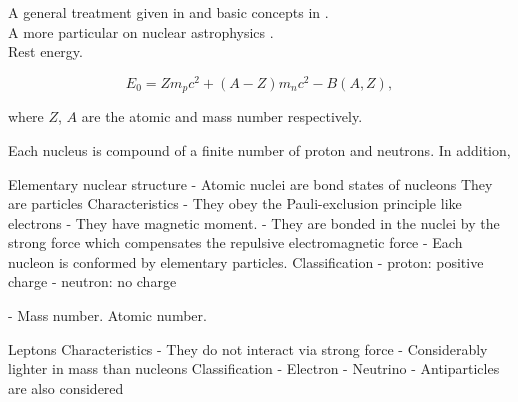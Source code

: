 \documentclass[openany]{book}
\begin{document}
A general treatment given in \cite{basdevant_rich_spiro_2004} and basic concepts in \cite{heyde_2020}. \\

A more particular on nuclear astrophysics \cite{iliadis_2015}. \\

Rest energy.

\begin{equation}
	E_0 = Zm_pc^2 + (A-Z)m_nc^2 - B(A, Z),
\end{equation}

where $Z$, $A$ are the atomic and mass number respectively. 



Each nucleus is compound of a finite number of proton and neutrons. In addition, 

Elementary nuclear structure 
-	Atomic nuclei are bond states of nucleons 
They are particles
Characteristics 
-	They obey the Pauli-exclusion principle like electrons
- 	They have magnetic moment.
-	They are bonded in the nuclei by the strong force which compensates the repulsive electromagnetic force
-	Each nucleon is conformed by elementary particles.
Classification 
-	proton: positive charge
-	neutron: no charge  

-	Mass number. Atomic number.

Leptons 
Characteristics
-	They do not interact via strong force
-	Considerably lighter in mass than nucleons
Classification 
-	Electron 
-	Neutrino 
-	Antiparticles are also considered



\end{document}

